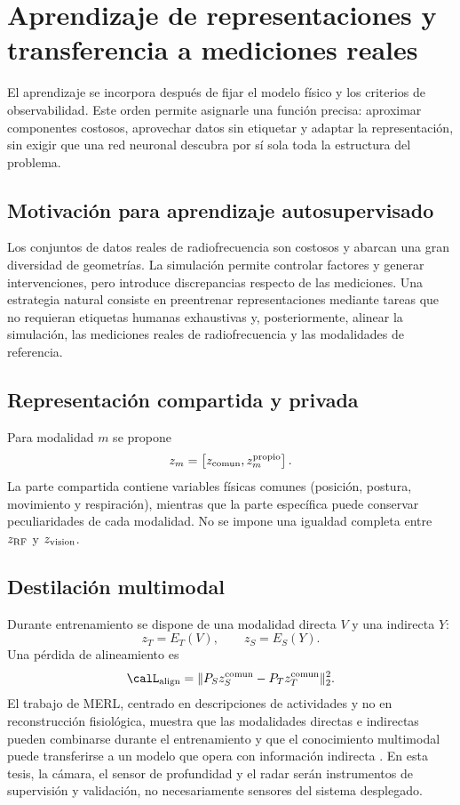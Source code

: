 \chapter{Aprendizaje de representaciones y transferencia a mediciones reales}
\label{ch:representation_learning}

El aprendizaje se incorpora después de fijar el modelo físico y los criterios de
observabilidad. Este orden permite asignarle una función precisa: aproximar componentes
costosos, aprovechar datos sin etiquetar y adaptar la representación, sin exigir que una
red neuronal descubra por sí sola toda la estructura del problema.

\section{Motivación para aprendizaje autosupervisado}

Los conjuntos de datos reales de radiofrecuencia son costosos y abarcan una gran diversidad de geometrías. La simulación permite controlar factores y generar intervenciones, pero introduce discrepancias respecto de las mediciones. Una estrategia natural consiste en preentrenar representaciones mediante tareas que no requieran etiquetas humanas exhaustivas y, posteriormente, alinear la simulación, las mediciones reales de radiofrecuencia y las modalidades de referencia.

\section{Representación compartida y privada}

Para modalidad $m$ se propone
\begin{equation}
z_m=\left[z_{\rm comun},z_m^{\rm propio}\right].
\end{equation}
La parte compartida contiene variables físicas comunes (posición, postura, movimiento y respiración), mientras que la parte específica puede conservar peculiaridades de cada modalidad. No se impone una igualdad completa entre $z_{\rm RF}$ y $z_{\rm vision}$.

\section{Destilación multimodal}

Durante entrenamiento se dispone de una modalidad directa $V$ y una indirecta $Y$:
\begin{equation}
z_T=E_T(V),\qquad z_S=E_S(Y).
\end{equation}
Una pérdida de alineamiento es
\begin{equation}
\calL_{\rm align}=
\|P_S z_S^{\rm comun}-P_Tz_T^{\rm comun}\|_2^2.
\end{equation}
El trabajo de MERL, centrado en descripciones de actividades y no en
reconstrucción fisiológica, muestra que las modalidades directas e indirectas pueden combinarse durante el entrenamiento y que el conocimiento multimodal puede transferirse a un modelo que opera con información indirecta \citep{Hori2024Fusion}. En esta tesis, la cámara, el sensor de profundidad y el radar serán instrumentos de supervisión y validación, no necesariamente sensores del sistema desplegado.

